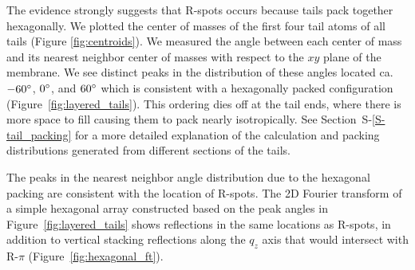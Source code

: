 \documentclass[journal=jpcbfk,manuscript=article]{achemso}
\begin{document}
  The evidence strongly suggests that R-spots occurs because tails pack 
  together hexagonally. We plotted the center of masses of the first four tail 
  atoms of all tails (Figure \ref{fig:centroids}). We measured the angle between
  each center of mass and its nearest neighbor center of masses with respect to
  the $xy$ plane of the membrane. We see distinct peaks in the distribution of
  these angles located ca. $-60\degree$, $0\degree$, and $60\degree$ which is
  consistent with a hexagonally packed configuration (Figure~\ref{fig:layered_tails}). 
  This ordering dies off at the tail ends, where there is more space to fill 
  causing them to pack nearly isotropically. See Section~S-\ref{S-tail_packing}
  for a more detailed explanation of the calculation and packing distributions
  generated from different sections of the tails.

  The peaks in the nearest neighbor angle distribution due to the hexagonal 
  packing are consistent with the location of R-spots. The 2D Fourier transform
  of a simple hexagonal array constructed based on the peak angles in 
  Figure~\ref{fig:layered_tails} shows reflections in the same locations as R-spots,
  in addition to vertical stacking reflections along the $q_z$ axis that would 
  intersect with R-$\pi$ (Figure~\ref{fig:hexagonal_ft}). 
\end{document}
